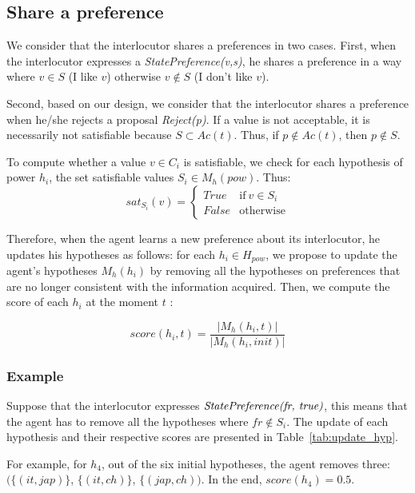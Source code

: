 \documentclass[conference, letterpaper]{IEEEtran}
\begin{document}
	\subsection{Share a preference}
		We consider that the interlocutor shares a preferences in two cases.
		First, when the interlocutor expresses a \emph{StatePreference(v,s)}, he shares a preference in a way where $v \in S$ (I like $v$) otherwise $v \notin S$ (I don't like $v$). 
		
		Second, based on our design, we consider that the interlocutor shares a preference when he/she rejects a proposal \emph{Reject(p)}. If a value is not acceptable, it is necessarily not satisfiable because $S \subset Ac(t)$. Thus, if $p\not\in Ac(t)$, then $p\not\in S$. 
		
		To compute whether a value $v \in C_i$ is satisfiable, we check for each hypothesis of power $h_i$, the set satisfiable values $S_i \in M_h(pow)$.
		Thus: 
			\begin{equation}
			sat_{S_i}(v)= \left\{\begin{array}{ll}
			True	 & \mathrm{if\ }  v \in S_i\\
			False & \mathrm{otherwise}
			\end{array}\right.
			\end{equation}
			
		Therefore, when the agent learns a new preference about its interlocutor, he updates his hypotheses as follows: 
		for each  $h_i \in H_{pow}$, we propose to update the agent's hypotheses $M_h(h_i)$ by removing all the hypotheses on preferences that are no longer consistent with the information acquired. 
		Then, we compute the score of each $h_i$ at the moment $t$ :
		
		$$score(h_i,t) = \frac{|M_h(h_i, t)|}{|M_h(h_i, init)|}$$
		
		\subsubsection*{\bf Example}
		
		Suppose that the interlocutor expresses $\emph{StatePreference(fr, true)}$, this means that the agent has to remove all the hypotheses where $fr \not\in S_i$. The update of each hypothesis and their respective scores are presented in Table~\ref{tab:update_hyp}. 
		
		For example, for $h_4$, out of the six initial hypotheses, the agent removes three: $(\{(it,jap)\}$, $\{(it,ch)\}$, $\{(jap,ch))$. In the end, $score(h_4) = 0.5$. 
	
\end{document}
